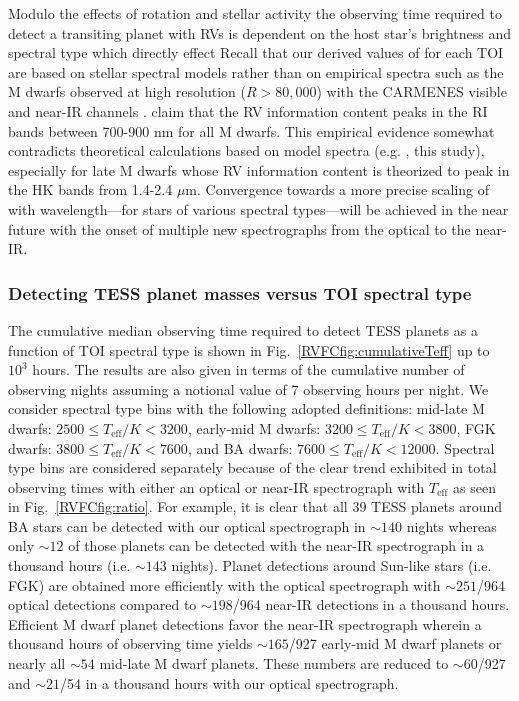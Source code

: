 Modulo the effects of rotation and stellar activity the observing time required to detect a transiting
planet with RVs is dependent on the host star's brightness and spectral type which directly effect  
Recall that our derived values of \sigRV{} for each TOI are based on stellar spectral models rather than on
empirical spectra such as the M dwarfs observed at high resolution ($R > 80,000$) with the CARMENES visible and
near-IR channels \citep{reiners18}. \cite{reiners18}
claim that the RV information content peaks in the RI bands
between 700-900 nm for all M dwarfs. This empirical evidence somewhat contradicts theoretical calculations
based on model spectra (e.g. \citealt{figueira16}, this study), especially for late M dwarfs whose RV
information content is theorized to peak in the HK bands from 1.4-2.4 $\mu$m. Convergence towards a more
precise scaling of \sigRV{} with wavelength---for stars of various spectral types---will be achieved in the
near future with the onset of multiple new spectrographs from the optical to the near-IR.


\subsubsection{Detecting TESS planet masses versus TOI spectral type}
The cumulative median observing time required to detect TESS planets as a function of TOI spectral type
is shown in Fig.~\ref{RVFCfig:cumulativeTeff} up to $10^3$ hours. The results are also given in terms of
the cumulative number of observing nights assuming a notional value of 7 observing hours per night. 
We consider spectral type bins with the following adopted definitions:
mid-late M dwarfs: $2500 \leq T_{\text{eff}}/K < 3200$,
early-mid M dwarfs: $3200 \leq T_{\text{eff}}/K < 3800$,
FGK dwarfs: $3800 \leq T_{\text{eff}}/K < 7600$, and
BA dwarfs: $7600 \leq T_{\text{eff}}/K < 12000$. Spectral type bins are considered separately
because of the clear trend exhibited in total observing times
with either an optical or near-IR spectrograph with $T_{\text{eff}}$ as seen in Fig.~\ref{RVFCfig:ratio}.
For example, it is clear that all 39 TESS planets around BA stars can be detected with our 
optical spectrograph in $\sim 140$ nights whereas only $\sim 12$ of those
planets can be detected with the near-IR spectrograph in a thousand hours (i.e. $\sim 143$ nights).
Planet detections around Sun-like
stars (i.e. FGK) are obtained more efficiently with the optical spectrograph with $\sim 251$/964 optical
detections compared to $\sim 198$/964 near-IR detections in a thousand hours.
Efficient M dwarf planet detections favor the near-IR
spectrograph wherein a thousand hours of observing time yields $\sim 165$/927 early-mid M dwarf planets
or nearly all $\sim 54$ mid-late M dwarf planets.
These numbers are reduced to $\sim 60$/927 and $\sim 21$/54 in a thousand hours with our 
optical spectrograph.

